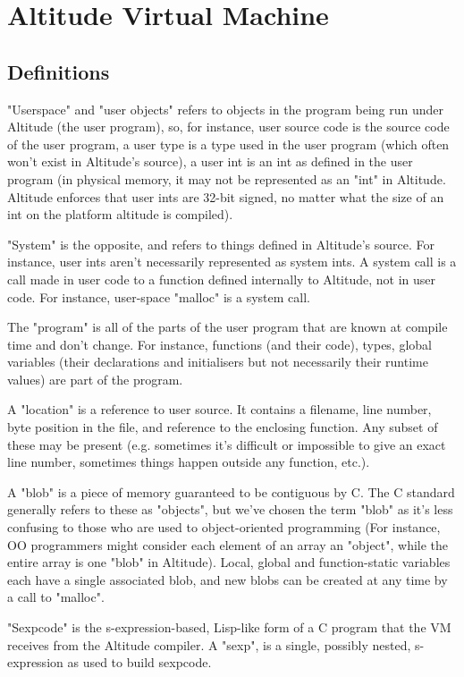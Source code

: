 \documentclass[10pt,a4paper]{report}
\begin{document}
\section{Altitude Virtual Machine}

\subsection{Definitions}
"Userspace" and "user objects" refers to objects in the program being run under Altitude (the user program), so, for instance, user source code is the source code of the user program, a user type is a type used in the user program (which often won't exist in Altitude's source), a user int is an int as defined in the user program (in physical memory, it may not be represented as an "int" in Altitude. Altitude enforces that user ints are 32-bit signed, no matter what the size of an int on the platform altitude is compiled).

"System" is the opposite, and refers to things defined in Altitude's source. For instance, user ints aren't necessarily represented as system ints. A system call is a call made in user code to a function defined internally to Altitude, not in user code. For instance, user-space "malloc" is a system call.

The "program" is all of the parts of the user program that are known at compile time and don't change. For instance, functions (and their code), types, global variables (their declarations and initialisers but not necessarily their runtime values) are part of the program.

A "location" is a reference to user source. It contains a filename, line number, byte position in the file, and reference to the enclosing function. Any subset of these may be present (e.g. sometimes it's difficult or impossible to give an exact line number, sometimes things happen outside any function, etc.).

A "blob" is a piece of memory guaranteed to be contiguous by C. The C standard generally refers to these as "objects", but we've chosen the term "blob" as it's less confusing to those who are used to object-oriented programming (For instance, OO programmers might consider each element of an array an "object", while the entire array is one "blob" in Altitude). Local, global and function-static variables each have a single associated blob, and new blobs can be created at any time by a call to "malloc".

"Sexpcode" is the s-expression-based, Lisp-like form of a C program that the VM receives from the Altitude compiler. A "sexp", is a single, possibly nested, s-expression as used to build sexpcode.
\end{document}
